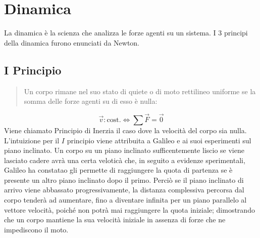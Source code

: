 \documentclass{article}
\numberwithin{equation}{subsection}
\begin{document}
\clearpage

\section{Dinamica}
La dinamica è la scienza che analizza le forze agenti su un 
sistema. I 3 principi della dinamica furono enunciati da Newton.

\subsection{I Principio}
\begin{quotation}
    Un corpo rimane nel suo stato di quiete o di moto rettilineo 
    uniforme se la somma delle forze agenti su di esso è nulla:
\end{quotation}
\begin{equation}
    \vec{v}:\mbox{cost.}\iff \sum\vec{F}=\vec{0}
\end{equation}
Viene chiamato Principio di Inerzia il caso dove la velocità 
del corpo sia nulla.
L'intuizione per il $I$ principio viene attribuita a Galileo 
e ai suoi esperimenti sul piano inclinato. Un corpo su un piano 
inclinato sufficentemente liscio se viene lasciato cadere 
avrà una certa veloticà che, in seguito a evidenze sperimentali,
Galileo ha constatao gli permette di raggiungere la quota di partenza 
se è presente un altro piano inclinato dopo il primo. 
Perciò se il piano inclinato di arrivo viene abbassato 
progressivamente, la distanza complessiva percorsa dal corpo tenderà ad 
aumentare, fino a diventare infinita per un piano parallelo al 
vettore velocità, poiché non potrà mai raggiungere la quota iniziale; 
dimostrando che un corpo mantiene la sua velocità iniziale 
in assenza di forze che ne impediscono il moto.

\begin{center}\end{center}
    
\end{document}
